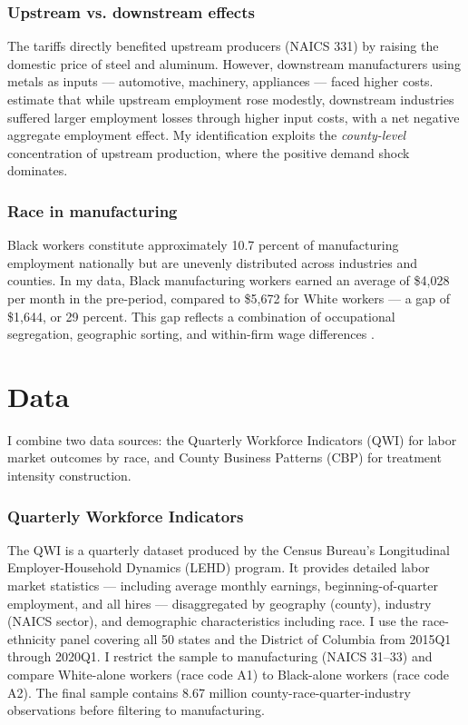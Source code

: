 \documentclass[12pt]{article}
\begin{document}
\subsubsection*{Upstream vs. downstream effects} The tariffs directly benefited upstream producers (NAICS 331) by raising the domestic price of steel and aluminum. However, downstream manufacturers using metals as inputs --- automotive, machinery, appliances --- faced higher costs. \citet{flaaen2020effect} estimate that while upstream employment rose modestly, downstream industries suffered larger employment losses through higher input costs, with a net negative aggregate employment effect. My identification exploits the \textit{county-level} concentration of upstream production, where the positive demand shock dominates.

\subsubsection*{Race in manufacturing} Black workers constitute approximately 10.7 percent of manufacturing employment nationally but are unevenly distributed across industries and counties. In my data, Black manufacturing workers earned an average of \$4,028 per month in the pre-period, compared to \$5,672 for White workers --- a gap of \$1,644, or 29 percent. This gap reflects a combination of occupational segregation, geographic sorting, and within-firm wage differences \citep{charles2008prejudice}.


\section{Data}

I combine two data sources: the Quarterly Workforce Indicators (QWI) for labor market outcomes by race, and County Business Patterns (CBP) for treatment intensity construction.

\subsubsection*{Quarterly Workforce Indicators} The QWI is a quarterly dataset produced by the Census Bureau's Longitudinal Employer-Household Dynamics (LEHD) program. It provides detailed labor market statistics --- including average monthly earnings, beginning-of-quarter employment, and all hires --- disaggregated by geography (county), industry (NAICS sector), and demographic characteristics including race. I use the race-ethnicity panel covering all 50 states and the District of Columbia from 2015Q1 through 2020Q1. I restrict the sample to manufacturing (NAICS 31--33) and compare White-alone workers (race code A1) to Black-alone workers (race code A2). The final sample contains 8.67 million county-race-quarter-industry observations before filtering to manufacturing.
\end{document}
